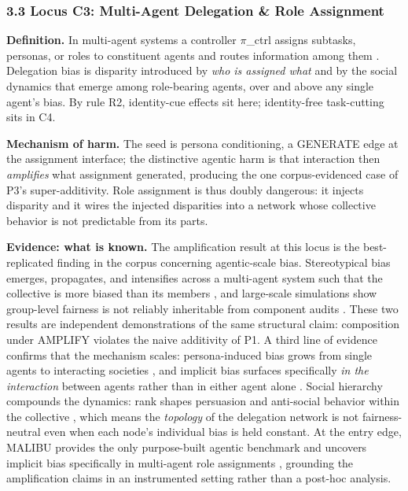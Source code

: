 \documentclass[10pt]{article}
\begin{document}
\subsubsection*{3.3 Locus C3: Multi-Agent Delegation \& Role Assignment}

\textbf{Definition.} In multi-agent systems a controller $\pi$\_ctrl assigns subtasks, personas, or roles to constituent agents and routes information among them \cite{wu2023autogen,guo2024large,qian2024chatdev}. Delegation bias is disparity introduced by \emph{who is assigned what} and by the social dynamics that emerge among role-bearing agents, over and above any single agent's bias. By rule R2, identity-cue effects sit here; identity-free task-cutting sits in C4.

\textbf{Mechanism of harm.} The seed is persona conditioning, a GENERATE edge at the assignment interface; the distinctive agentic harm is that interaction then \emph{amplifies} what assignment generated, producing the one corpus-evidenced case of P3's super-additivity. Role assignment is thus doubly dangerous: it injects disparity and it wires the injected disparities into a network whose collective behavior is not predictable from its parts.

\textbf{Evidence: what is known.} The amplification result at this locus is the best-replicated finding in the corpus concerning agentic-scale bias. Stereotypical bias emerges, propagates, and intensifies across a multi-agent system such that the collective is more biased than its members \cite{nguyen2025social}, and large-scale simulations show group-level fairness is not reliably inheritable from component audits \cite{madigan2025emergent}. These two results are independent demonstrations of the same structural claim: composition under AMPLIFY violates the naive additivity of P1. A third line of evidence confirms that the mechanism scales: persona-induced bias grows from single agents to interacting societies \cite{li2025from}, and implicit bias surfaces specifically \emph{in the interaction} between agents rather than in either agent alone \cite{borah2024implicit}. Social hierarchy compounds the dynamics: rank shapes persuasion and anti-social behavior within the collective \cite{campedelli2024want}, which means the \emph{topology} of the delegation network is not fairness-neutral even when each node's individual bias is held constant. At the entry edge, MALIBU provides the only purpose-built agentic benchmark and uncovers implicit bias specifically in multi-agent role assignments \cite{mirza2025malibu}, grounding the amplification claims in an instrumented setting rather than a post-hoc analysis.
\end{document}
